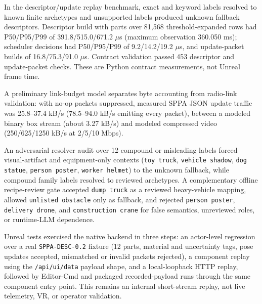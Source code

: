 \documentclass[10pt]{article}
\begin{document}
In the descriptor/update replay benchmark, exact and keyword labels resolved
to known finite archetypes and unsupported labels produced unknown fallback
descriptors. Descriptor build with parts over 81,568 threshold-expanded rows
had P50/P95/P99 of 391.8/515.0/671.2 \(\mu\)s (maximum observation 360.050
ms); scheduler decisions had P50/P95/P99 of 9.2/14.2/19.2 \(\mu\)s, and
update-packet builds of 16.8/75.3/91.0 \(\mu\)s. Contract validation passed
453 descriptor and update-packet checks. These are Python contract
measurements, not Unreal frame time.

A preliminary link-budget model separates byte accounting from radio-link
validation: with no-op packets suppressed, measured SPPA JSON update traffic
was 25.8--37.4 kB/s (78.5--94.0 kB/s emitting every packet), between a modeled
binary box stream (about 3.27 kB/s) and modeled compressed video
(250/625/1250 kB/s at 2/5/10 Mbps).

An adversarial resolver audit over 12 compound or misleading labels forced
visual-artifact and equipment-only contexts (\texttt{toy truck},
\texttt{vehicle shadow}, \texttt{dog statue}, \texttt{person poster},
\texttt{worker helmet}) to the unknown fallback, while compound family labels
resolved to reviewed archetypes. A complementary offline recipe-review gate
accepted \texttt{dump truck} as a reviewed heavy-vehicle mapping, allowed
\texttt{unlisted obstacle} only as fallback, and rejected \texttt{person
poster}, \texttt{delivery drone}, and \texttt{construction crane} for false
semantics, unreviewed roles, or runtime-LLM dependence.

Unreal tests exercised the native backend in three steps: an actor-level
regression over a real \texttt{SPPA-DESC-0.2} fixture (12 parts, material and
uncertainty tags, pose updates accepted, mismatched or invalid packets
rejected), a component replay using the \texttt{/api/ui/data} payload shape,
and a local-loopback HTTP replay, followed by Editor-Cmd and packaged
recorded-payload runs through the same component entry point. This remains an
internal short-stream replay, not live telemetry, VR, or operator validation.
\end{document}
